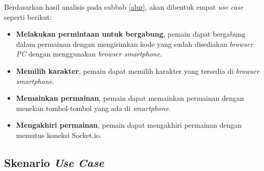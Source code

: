 Berdasarkan hasil analisis pada subbab \ref{alur}, akan dibentuk empat \textit{use case} seperti berikut:

\begin{itemize}
	\item \textbf{Melakukan permintaan untuk bergabung}, pemain dapat bergabung dalam permainan dengan mengirimkan kode yang sudah disediakan \textit{browser PC} dengan menggunakan \textit{browser smartphone}.
	
	\item \textbf{Memilih karakter}, pemain dapat memilih karakter yang tersedia di \textit{browser smartphone}.
	
	\item \textbf{Memainkan permainan}, pemain dapat memainkan permainan dengan menekan tombol-tombol yang ada di \textit{smartphone}.
	
	\item \textbf{Mengakhiri permainan}, pemain dapat mengakhiri permainan dengan memutus koneksi Socket.io.
\end{itemize}

\subsection{Skenario \textit{Use Case}}

